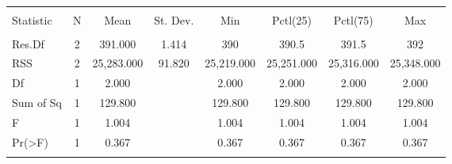 
\begin{table}[!htbp] \centering 
  \caption{} 
  \label{} 
\begin{tabular}{@{\extracolsep{5pt}}lccccccc} 
\\[-1.8ex]\hline 
\hline \\[-1.8ex] 
Statistic & \multicolumn{1}{c}{N} & \multicolumn{1}{c}{Mean} & \multicolumn{1}{c}{St. Dev.} & \multicolumn{1}{c}{Min} & \multicolumn{1}{c}{Pctl(25)} & \multicolumn{1}{c}{Pctl(75)} & \multicolumn{1}{c}{Max} \\ 
\hline \\[-1.8ex] 
Res.Df & 2 & 391.000 & 1.414 & 390 & 390.5 & 391.5 & 392 \\ 
RSS & 2 & 25,283.000 & 91.820 & 25,219.000 & 25,251.000 & 25,316.000 & 25,348.000 \\ 
Df & 1 & 2.000 &  & 2.000 & 2.000 & 2.000 & 2.000 \\ 
Sum of Sq & 1 & 129.800 &  & 129.800 & 129.800 & 129.800 & 129.800 \\ 
F & 1 & 1.004 &  & 1.004 & 1.004 & 1.004 & 1.004 \\ 
Pr(\textgreater F) & 1 & 0.367 &  & 0.367 & 0.367 & 0.367 & 0.367 \\ 
\hline \\[-1.8ex] 
\end{tabular} 
\end{table} 
